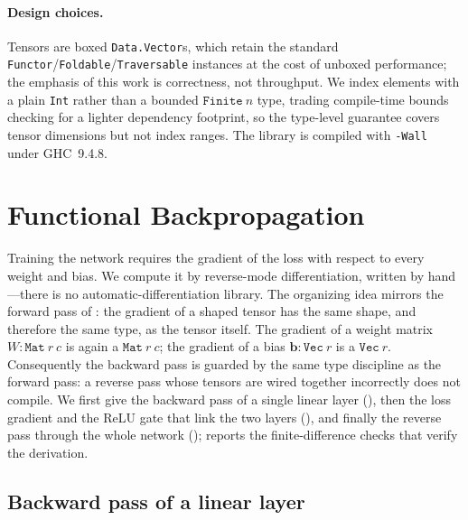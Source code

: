 \documentclass[sigconf,nonacm]{acmart}
\begin{document}
\paragraph{Design choices.}
Tensors are boxed \texttt{Data.Vector}s, which retain the standard
\texttt{Functor}/\texttt{Foldable}/\texttt{Traversable} instances at the cost of
unboxed performance; the emphasis of this work is correctness, not throughput.
We index elements with a plain \texttt{Int} rather than a bounded
\(\mathtt{Finite}\ n\) type, trading compile-time bounds checking for a lighter
dependency footprint, so the type-level guarantee covers tensor dimensions but
not index ranges. The library is compiled with \texttt{-Wall} under GHC~9.4.8.

\section{Functional Backpropagation}
\label{sec:backprop}

Training the network requires the gradient of the loss with respect to every
weight and bias. We compute it by reverse-mode differentiation, written by
hand---there is no automatic-differentiation library. The organizing idea
mirrors the forward pass of : the gradient of a shaped
tensor has the same shape, and therefore the same type, as the tensor itself.
The gradient of a weight matrix \(W : \mathtt{Mat}\ r\ c\) is again a
\(\mathtt{Mat}\ r\ c\); the gradient of a bias \(\mathbf{b} : \mathtt{Vec}\ r\)
is a \(\mathtt{Vec}\ r\). Consequently the backward pass is guarded by the same
type discipline as the forward pass: a reverse pass whose tensors are wired
together incorrectly does not compile. We first give the backward pass of a
single linear layer (), then the loss gradient and the ReLU
gate that link the two layers (), and finally the reverse pass
through the whole network ();  reports the
finite-difference checks that verify the derivation.

\subsection{Backward pass of a linear layer}
\label{sec:bp:layer}
\end{document}
